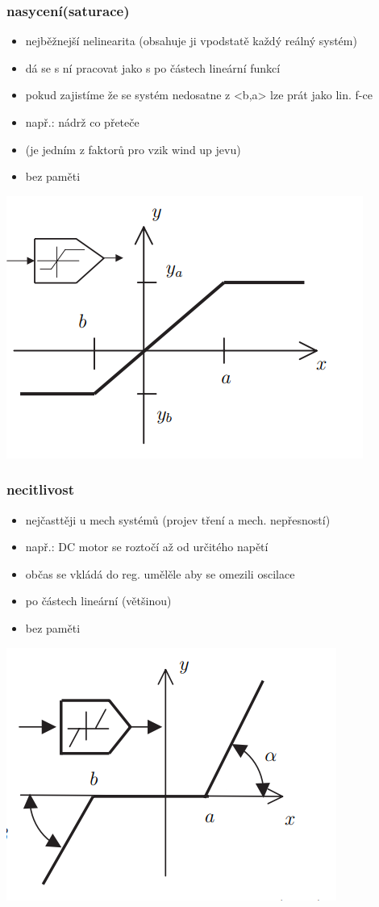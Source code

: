 \subsubsection*{nasycení(saturace)}
\begin{itemize}
    \item nejběžnejší nelinearita (obsahuje ji vpodstatě každý reálný systém)
    \item dá se s ní pracovat jako s po částech lineární funkcí
    \item pokud zajistíme že se systém nedosatne z <b,a> lze prát jako lin. f-ce 
    \item např.: nádrž co přeteče
    \item (je jedním z faktorů pro vzik wind up jevu)
    \item bez paměti
\end{itemize}
\includegraphics[]{img/saturace.png}

\subsubsection*{necitlivost}
\begin{itemize}
    \item nejčasttěji u mech systémů (projev tření a mech. nepřesností)
    \item např.: DC motor se roztočí až od určitého napětí
    \item občas se vkládá do reg. umělěle aby se omezili oscilace
    \item po částech lineární (většinou)
    \item bez paměti
\end{itemize}
\includegraphics{img/necitlivost.png}

